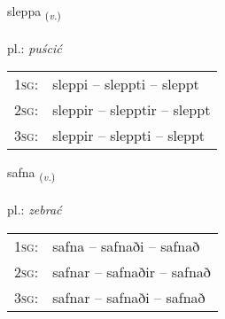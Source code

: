 \documentclass[frontgrid, backgrid]{flacards}\usepackage[]{graphicx}\usepackage[]{xcolor}
\begin{document}
\renewcommand{\flhead}{\vskip5pt \fboxsep=0pt {\small\bfseries\footnotesize Sagnorð | czasownik}}
\renewcommand{\fcfoot}{\vskip5pt \fboxsep=0pt \hspace{2pt}{\small\bfseries\footnotesize 1K}}

\renewcommand{\blhead}{\vskip5pt {\small\bfseries\footnotesize Sagnorð | czasownik }}
\renewcommand{\bcfoot}{\vskip5pt \hspace{2pt}{\small\bfseries\footnotesize 1K}}


{sleppa \small{\textsubscript{(\textit{v.})}} \\[1ex] %
\textphonetic{[stlɛhpa]} \\
pl.: \emph{puścić} \\  [2ex]
\renewcommand*{\arraystretch}{0.8}
\begin{tabular}{p{1cm}l}
\textsc{1sg}: & sleppi -- sleppti -- sleppt \\ 
\textsc{2sg}: & sleppir -- slepptir -- sleppt \\ 
\textsc{3sg}: & sleppir -- sleppti -- sleppt \\ 
\end{tabular}
}

\renewcommand{\flhead}{\vskip5pt \fboxsep=0pt {\small\bfseries\footnotesize Sagnorð | czasownik}}
\renewcommand{\fcfoot}{\vskip5pt \fboxsep=0pt \hspace{2pt}{\small\bfseries\footnotesize 1K}}

\renewcommand{\blhead}{\vskip5pt {\small\bfseries\footnotesize Sagnorð | czasownik }}
\renewcommand{\bcfoot}{\vskip5pt \hspace{2pt}{\small\bfseries\footnotesize 1K}}


{safna \small{\textsubscript{(\textit{v.})}} \\[1ex] %
\textphonetic{[sapna]} \\
pl.: \emph{zebrać} \\  [2ex]
\renewcommand*{\arraystretch}{0.8}
\begin{tabular}{p{1cm}l}
\textsc{1sg}: & safna -- safnaði -- safnað \\ 
\textsc{2sg}: & safnar -- safnaðir -- safnað \\ 
\textsc{3sg}: & safnar -- safnaði -- safnað \\ 
\end{tabular}
}
\end{document}
